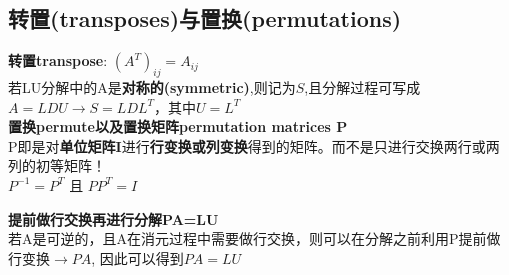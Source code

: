     \subsection{转置(transposes)与置换(permutations)}
    \textbf{转置transpose}: $(A^T)_{ij} = A_{ij}$\\
    若LU分解中的A是\textbf{对称的(symmetric)},则记为$S$,且分解过程可写成$A=LDU \rightarrow S=LDL^T$，其中$U=L^T$
    \\
    \textbf{置换permute以及置换矩阵permutation matrices P}\\
    P即是对\textbf{单位矩阵I}进行\textbf{行变换或列变换}得到的矩阵。而不是只进行交换两行或两列的初等矩阵！\\
    $P^{-1} = P^T$ 且 $PP^T = I$

    \textbf{提前做行交换再进行分解PA=LU}\\
    若A是可逆的，且A在消元过程中需要做行交换，则可以在分解之前利用P提前做行变换$\rightarrow PA$,
    因此可以得到$PA=LU$